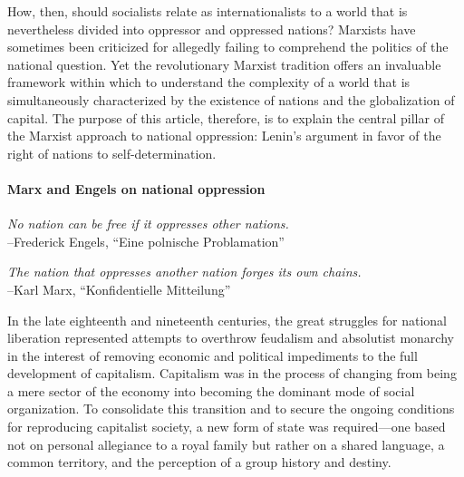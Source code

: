 How, then, should socialists relate as internationalists to a world that is nevertheless divided into oppressor and oppressed nations? Marxists have sometimes been criticized for allegedly failing to comprehend the politics of the national question. Yet the revolutionary Marxist tradition offers an invaluable framework within which to understand the complexity of a world that is simultaneously characterized by the existence of nations and the globalization of capital. The purpose of this article, therefore, is to explain the central pillar of the Marxist approach to national oppression: Lenin's argument in favor of the right of nations to self-determination.

\paragraph{Marx and Engels on national oppression}

\begin{flushleft}\emph{No nation can be free if it oppresses other nations.}\\
--Frederick Engels, ``Eine polnische Problamation''
\end{flushleft}

\begin{flushleft}\emph{The nation that oppresses another nation forges its own chains.}\\
--Karl Marx, ``Konfidentielle Mitteilung''
\end{flushleft}

In the late eighteenth and nineteenth centuries, the great struggles for national liberation represented attempts to overthrow feudalism and absolutist monarchy in the interest of removing economic and political impediments to the full development of capitalism. Capitalism was in the process of changing from being a mere sector of the economy into becoming the dominant mode of social organization. To consolidate this transition and to secure the ongoing conditions for reproducing capitalist society, a new form of state was required---one based not on personal allegiance to a royal family but rather on a shared language, a common territory, and the perception of a group history and destiny.

